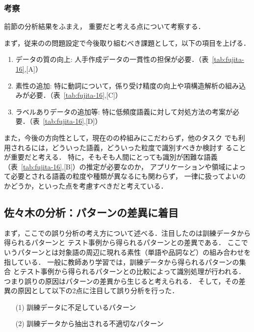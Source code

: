 \documentclass[japanese]{jnlp_1.4}
\newcommand{\WSD}{}
\begin{document}
\subsubsection{考察}
\label{sec:fujita-matome}

前節の分析結果をふまえ，
重要だと考える点について考察する．


まず，従来の\WSD{}の問題設定で今後取り組むべき課題として，以下の項目を上げる．

\begin{enumerate}
\item データの質の向上:
 人手作成データの一貫性の担保が必要．（表~\ref{tab:fujita-16},[A]）
\item 素性の追加:
 特に動詞について，係り受け精度の向上や項構造解析の組み込みが必要．（表~\ref{tab:fujita-16},[C]）
\item ラベルありデータの追加等:
 特に低頻度語義に対して対処方法の考案が必要．（表~\ref{tab:fujita-16},[D]）
\end{enumerate}

また，今後の方向性として，現在の\WSD{}の枠組みにこだわらず，他のタスク
でも利用されるには，どういった語義，どういった粒度で識別すべきか検討す
ることが重要だと考える．
特に，そもそも人間にとっても識別が困難な語義（表~\ref{tab:fujita-16},[B]）の推定が必要なのか，
アプリケーションや領域によって必要とされる語義の粒度や種類が異なるにも関わらず，
一律に扱ってよいのかどうか，といった点を考慮すべきだと考えている．


\subsection{佐々木の分析：パターンの差異に着目}

まず，ここでの誤り分析の考え方について述べる．注目したのは訓練データから得られるパターンと
テスト事例から得られるパターンとの差異である．
ここでいうパターンとは対象語の周辺に現れる素性（単語や品詞など）の組み合わせを指している．
一般に教師あり学習では，訓練データから得られるパターンの集合
とテスト事例から得られるパターンとの比較によって識別処理が行われる．
つまり誤りの原因はパターンの差異から生じると考えられる．
そして，その差異の原因として以下の2点に注目して誤り分析を行った．

\begin{itemize}
\item[(1)] 訓練データに不足しているパターン
\item[(2)] 訓練データから抽出される不適切なパターン
\end{itemize}
\end{document}
